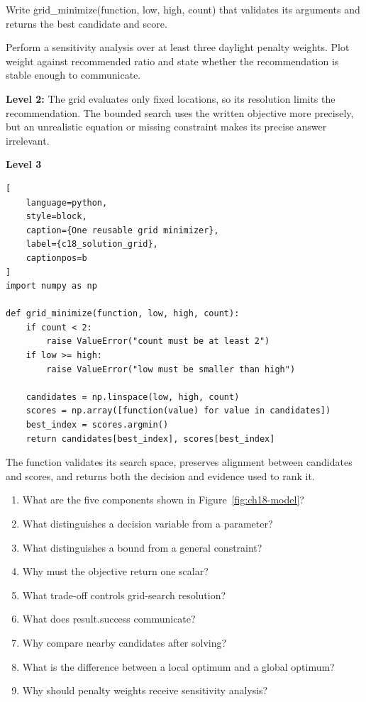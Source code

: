 
Write \c{grid_minimize(function, low, high, count)} that validates its arguments
and returns the best candidate and score.


Perform a sensitivity analysis over at least three daylight penalty weights.
Plot weight against recommended ratio and state whether the recommendation is
stable enough to communicate.


\textbf{Level 2:} The grid evaluates only fixed locations, so its resolution
limits the recommendation. The bounded search uses the written objective more
precisely, but an unrealistic equation or missing constraint makes its precise
answer irrelevant.

\textbf{Level 3}

\begin{lstlisting}[
    language=python,
    style=block,
    caption={One reusable grid minimizer},
    label={c18_solution_grid},
    captionpos=b
]
import numpy as np

def grid_minimize(function, low, high, count):
    if count < 2:
        raise ValueError("count must be at least 2")
    if low >= high:
        raise ValueError("low must be smaller than high")

    candidates = np.linspace(low, high, count)
    scores = np.array([function(value) for value in candidates])
    best_index = scores.argmin()
    return candidates[best_index], scores[best_index]
\end{lstlisting}

The function validates its search space, preserves alignment between candidates
and scores, and returns both the decision and evidence used to rank it.


\begin{enumerate}
    \item What are the five components shown in Figure~\ref{fig:ch18-model}?
    \item What distinguishes a decision variable from a parameter?
    \item What distinguishes a bound from a general constraint?
    \item Why must the objective return one scalar?
    \item What trade-off controls grid-search resolution?
    \item What does \c{result.success} communicate?
    \item Why compare nearby candidates after solving?
    \item What is the difference between a local optimum and a global optimum?
    \item Why should penalty weights receive sensitivity analysis?
\end{enumerate}

